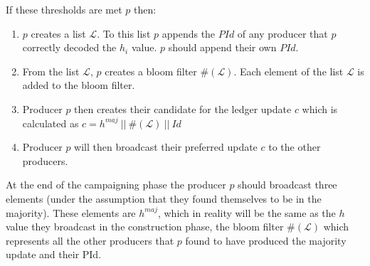 If these thresholds are met $p$ then:
\begin{enumerate}
\item $p$ creates a list $\mathcal{L}$. To this list $p$ appends the $PId$ of any producer that $p$ correctly decoded the $h_i$ value. $p$ should append their own $PId$.
\item From the list $\mathcal{L}$, $p$ creates a bloom filter $\#(\mathcal{L})$. Each element of the list  $\mathcal{L}$ is added to the bloom filter. 
\item Producer $p$ then creates their candidate for the ledger update $c$ which is calculated as $c = h^{maj}~||~\#(\mathcal{L})~||~Id$
\item Producer $p$ will then broadcast their preferred update $c$ to the other producers.
\end{enumerate}

At the end of the campaigning phase the producer $p$ should broadcast three elements (under the assumption that they found themselves to be in the majority). These elements are $h^{maj}$, which in reality will be the same as the $h$ value they broadcast in the construction phase, the bloom filter $\#(\mathcal{L})$ which represents all the other producers that $p$ found to have produced the majority update and their PId. \\


